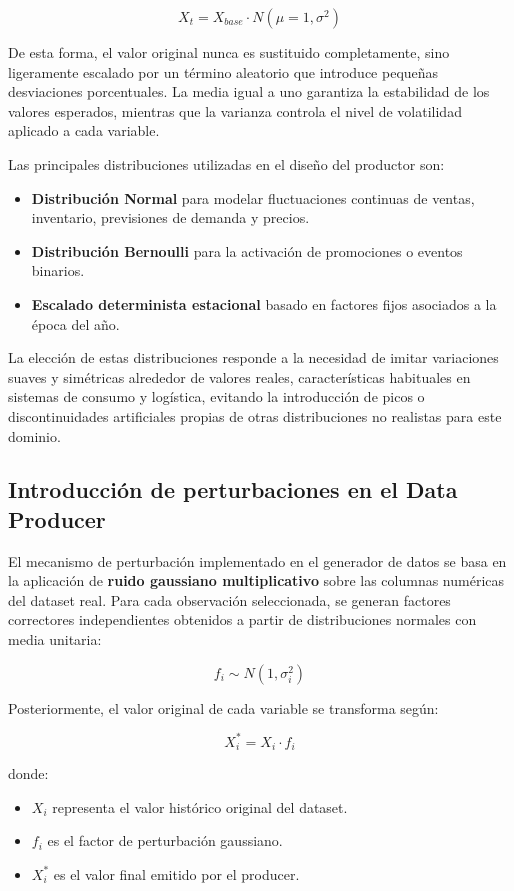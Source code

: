 \documentclass[12pt,a4paper]{article}
\begin{document}
	\[
	X_t = X_{base} \cdot N(\mu=1,\sigma^2)
	\]
	
	De esta forma, el valor original nunca es sustituido completamente, sino ligeramente escalado por un término aleatorio que introduce pequeñas desviaciones porcentuales. La media igual a uno garantiza la estabilidad de los valores esperados, mientras que la varianza controla el nivel de volatilidad aplicado a cada variable.
	
	Las principales distribuciones utilizadas en el diseño del productor son:
	
	\begin{itemize}
		\item \textbf{Distribución Normal} para modelar fluctuaciones continuas de ventas, inventario, previsiones de demanda y precios.
		\item \textbf{Distribución Bernoulli} para la activación de promociones o eventos binarios.
		\item \textbf{Escalado determinista estacional} basado en factores fijos asociados a la época del año.
	\end{itemize}
	
	La elección de estas distribuciones responde a la necesidad de imitar variaciones suaves y simétricas alrededor de valores reales, características habituales en sistemas de consumo y logística, evitando la introducción de picos o discontinuidades artificiales propias de otras distribuciones no realistas para este dominio.
	
	\subsection{Introducción de perturbaciones en el Data Producer}
	
	El mecanismo de perturbación implementado en el generador de datos se basa en la aplicación de \textbf{ruido gaussiano multiplicativo} sobre las columnas numéricas del dataset real. Para cada observación seleccionada, se generan factores correctores independientes obtenidos a partir de distribuciones normales con media unitaria:
	
	\[
	f_i \sim N(1, \sigma_i^2)
	\]
	
	Posteriormente, el valor original de cada variable se transforma según:
	
	\[
	X^\ast_i = X_i \cdot f_i
	\]
	
	donde:
	
	\begin{itemize}
		\item $X_i$ representa el valor histórico original del dataset.
		\item $f_i$ es el factor de perturbación gaussiano.
		\item $X^\ast_i$ es el valor final emitido por el producer.
	\end{itemize}
	
\end{document}
